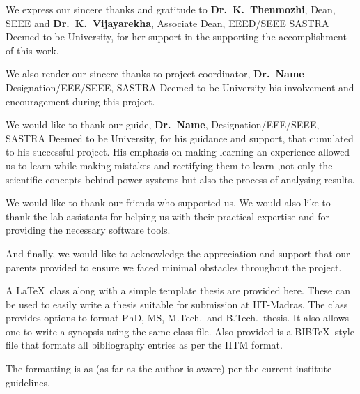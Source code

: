 \documentclass[a4paper, 12pt, oneside]{sastra}
\begin{document}
	\par We express our sincere thanks and gratitude to \textbf{Dr.~K.~Thenmozhi}, Dean, SEEE and \textbf{Dr.~K.~Vijayarekha}, Associate Dean, EEED/SEEE SASTRA Deemed to be University, for her support in the supporting the accomplishment of this work.
	
	\par We also render our sincere thanks to project coordinator, \textbf{Dr.~Name} Designation/EEE/SEEE, SASTRA Deemed to be University his involvement and encouragement during this project.
	
	\par We would like to thank our guide, \textbf{Dr.~Name}, Designation/EEE/SEEE, SASTRA Deemed to be University, for his guidance and support, that cumulated to his successful project. His emphasis on making learning an experience allowed us to learn while making mistakes and rectifying them to learn ,not only the scientific concepts behind power systems but also the process of analysing results.
	
	\par We would like to thank our friends who supported us. We would also like to thank the lab assistants for helping us with their practical expertise and for providing the necessary software tools.
	
	\par And finally, we would like to acknowledge the appreciation and support that our parents provided to ensure we faced minimal obstacles throughout the project.
	\pagebreak
	
	\abstract
	
	\begin{doublespace}
		\linespread{2}
	\vspace*{24pt}
	
	\noindent A \LaTeX\ class along with a simple template thesis are provided here.  These can be used to easily write a thesis suitable for submission at IIT-Madras.  The class provides options to format PhD, MS, M.Tech.\ and B.Tech.\ thesis.  It also allows one to write a synopsis using the same class file.  Also provided is a BIB\TeX\ style file that formats all bibliography entries as per the IITM format.
	
	The formatting is as (as far as the author is aware) per the current institute guidelines.
	
\end{doublespace}
	\pagebreak
	
\end{document}
